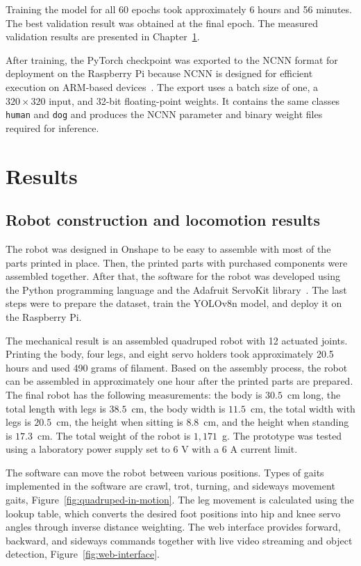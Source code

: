 \documentclass[a4paper,12pt]{report}
\begin{document}
Training the model for all 60 epochs took approximately 6 hours and 56 minutes. The best validation
result was obtained at the final epoch. The measured validation results are presented in
Chapter~\ref{chap:results}.

After training, the PyTorch checkpoint was exported to the NCNN format for deployment on the
Raspberry Pi because NCNN is designed for efficient execution on ARM-based
devices~\parencite{ncnn}. The export uses a batch size of one, a $320 \times 320$ input, and 32-bit
floating-point weights. It contains the same classes \texttt{human} and \texttt{dog} and produces
the NCNN parameter and binary weight files required for inference.

\chapter{Results}
\label{chap:results}
\section{Robot construction and locomotion results}
The robot was designed in Onshape to be easy to assemble with most of the parts printed in place.
Then, the printed parts with purchased components were assembled together. After that, the software
for the robot was developed using the Python programming language and the Adafruit ServoKit
library~\parencite{servokit}. The last steps were to prepare the dataset, train the YOLOv8n model,
and deploy it on the Raspberry Pi.

The mechanical result is an assembled quadruped robot with 12 actuated joints. Printing the body,
four legs, and eight servo holders took approximately 20.5 hours and used 490 grams of filament.
Based on the assembly process, the robot can be assembled in approximately one hour after the
printed parts are prepared. The final robot has the following measurements: the body is $30.5$~cm
long, the total length with legs is $38.5$~cm, the body width is $11.5$~cm, the total width with
legs is $20.5$~cm, the height when sitting is $8.8$~cm, and the height when standing is $17.3$~cm.
The total weight of the robot is $1,171$~g. The prototype was tested using a laboratory power supply
set to 6 V with a 6 A current limit.

The software can move the robot between various positions. Types of gaits implemented in the
software are crawl, trot, turning, and sideways movement gaits,
Figure~\ref{fig:quadruped-in-motion}. The leg movement is calculated using the lookup table, which
converts the desired foot positions into hip and knee servo angles through inverse distance
weighting. The web interface provides forward, backward, and sideways commands together with live
video streaming and object detection, Figure~\ref{fig:web-interface}.
\end{document}
